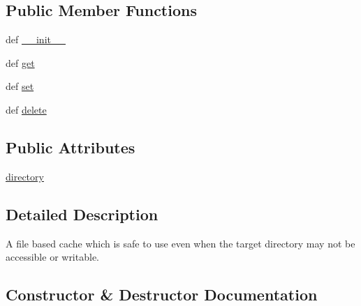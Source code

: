 \subsection*{Public Member Functions}
\begin{DoxyCompactItemize}
\item 
def \hyperlink{classpip_1_1__internal_1_1network_1_1cache_1_1SafeFileCache_a6607147466379cd7d9ce9c829dc1982e}{\+\_\+\+\_\+init\+\_\+\+\_\+}
\item 
def \hyperlink{classpip_1_1__internal_1_1network_1_1cache_1_1SafeFileCache_abf6dd068f35eee92bd0e0469fedd92b5}{get}
\item 
def \hyperlink{classpip_1_1__internal_1_1network_1_1cache_1_1SafeFileCache_abca74e1084d0eb307732f1516b5d0baf}{set}
\item 
def \hyperlink{classpip_1_1__internal_1_1network_1_1cache_1_1SafeFileCache_a629c6c943fd8122fa40115ae4d357611}{delete}
\end{DoxyCompactItemize}
\subsection*{Public Attributes}
\begin{DoxyCompactItemize}
\item 
\hyperlink{classpip_1_1__internal_1_1network_1_1cache_1_1SafeFileCache_a62ff25cd7db4f2f2651454fe827dc8f2}{directory}
\end{DoxyCompactItemize}


\subsection{Detailed Description}
\begin{DoxyVerb}A file based cache which is safe to use even when the target directory may
not be accessible or writable.
\end{DoxyVerb}
 

\subsection{Constructor \& Destructor Documentation}
\mbox{\label{classpip_1_1__internal_1_1network_1_1cache_1_1SafeFileCache_a6607147466379cd7d9ce9c829dc1982e}} 
